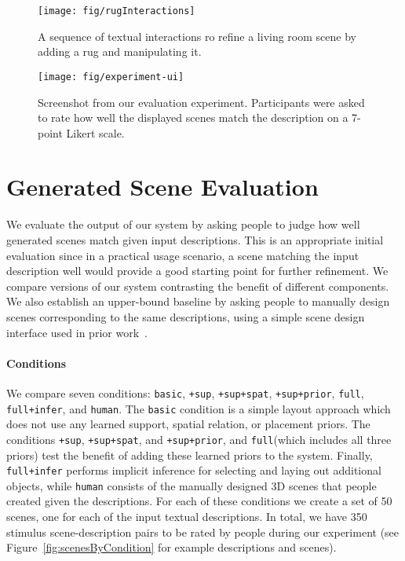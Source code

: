 \documentclass{sigchi}
\newcommand{\cbasic}{\texttt{basic}\xspace}
\newcommand{\csup}{\texttt{+sup}\xspace}
\newcommand{\csupspat}{\texttt{+sup+spat}\xspace}
\newcommand{\csupprior}{\texttt{+sup+prior}\xspace}
\newcommand{\cfull}{\texttt{full}\xspace}
\newcommand{\cinfer}{\texttt{full+infer}\xspace}
\newcommand{\cmanual}{\texttt{human}\xspace}
\begin{document}
\begin{figure}
  \texttt{[image: fig/rugInteractions]}
  \caption{A sequence of textual interactions ro refine a living room scene by adding a rug and manipulating it.}
  \label{fig:rugInteractions}
\end{figure}

\begin{figure}
  \centering
  \texttt{[image: fig/experiment-ui]}
  \caption{Screenshot from our evaluation experiment. Participants were asked to rate how well the displayed scenes match the description on a 7-point Likert scale.}
  \label{fig:experiment-ui}
\end{figure}


\section{Generated Scene Evaluation}

We evaluate the output of our system by asking people to judge how well generated scenes match given input descriptions.  This is an appropriate initial evaluation since in a practical usage scenario, a scene matching the input description well would provide a good starting point for further refinement.  We compare versions of our system contrasting the benefit of different components. We also establish an upper-bound baseline by asking people to manually design scenes corresponding to the same descriptions, using a simple scene design interface used in prior work~\cite{fisher2012example}.

\paragraph{Conditions}
We compare seven conditions: \cbasic, \csup, \csupspat, \csupprior, \cfull, \cinfer, and \cmanual.  The \cbasic condition is a simple layout approach which does not use any learned support, spatial relation, or placement priors.  The conditions \csup, \csupspat, and \csupprior, and \cfull (which includes all three priors) test the benefit of adding these learned priors to the system.  Finally, \cinfer performs implicit inference for selecting and laying out additional objects, while \cmanual consists of the manually designed 3D scenes that people created given the descriptions.  For each of these conditions we create a set of 50 scenes, one for each of the input textual descriptions.  In total, we have 350 stimulus scene-description pairs to be rated by people during our experiment (see Figure~\ref{fig:scenesByCondition} for example descriptions and scenes).
\end{document}
